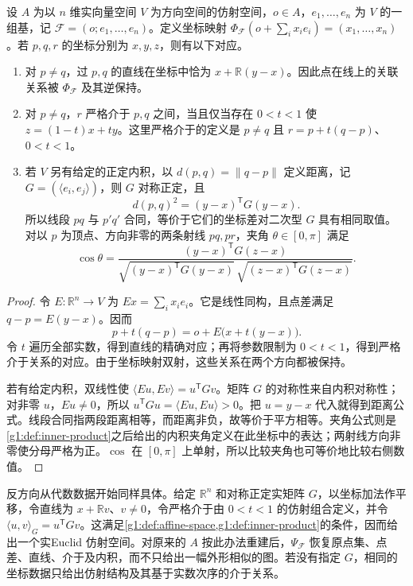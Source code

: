\begin{proposition}\label{g1:prop:affine-model-relations}
	设 \(A\) 为以 \(n\) 维实向量空间 \(V\) 为方向空间的仿射空间，\(o\in A\)，\(e_1,\ldots,e_n\) 为 \(V\) 的一组基，记 \(\mathcal F=(o;e_1,\ldots,e_n)\)。定义坐标映射 \(\Phi_{\mathcal F}(o+\sum_i x_i e_i)=(x_1,\ldots,x_n)\)。若 \(p,q,r\) 的坐标分别为 \(x,y,z\)，则有以下对应。
	\begin{enumerate}
		\item 对 \(p\ne q\)，过 \(p,q\) 的直线在坐标中恰为 \(x+\mathbb R(y-x)\)。因此点在线上的关联关系被 \(\Phi_{\mathcal F}\) 及其逆保持。
		\item 对 \(p\ne q\)，\(r\) 严格介于 \(p,q\) 之间，当且仅当存在 \(0<t<1\) 使 \(z=(1-t)x+ty\)。这里严格介于的定义是 \(p\ne q\) 且 \(r=p+t(q-p)\)、\(0<t<1\)。
		\item 若 \(V\) 另有给定的正定内积，以 \(d(p,q)=\lVert q-p\rVert\) 定义距离，记 \(G=(\langle e_i,e_j\rangle)\)，则 \(G\) 对称正定，且
		\begin{equation}\label{g1:eq:coordinate-model-distance}
			d(p,q)^2=(y-x)^{\mathsf T}G(y-x).
		\end{equation}
		所以线段 \(pq\) 与 \(p'q'\) 合同，等价于它们的坐标差对二次型 \(G\) 具有相同取值。对以 \(p\) 为顶点、方向非零的两条射线 \(pq,pr\)，夹角 \(\theta\in[0,\pi]\) 满足
		\[
			\cos\theta=
			\frac{(y-x)^{\mathsf T}G(z-x)}
			{\sqrt{(y-x)^{\mathsf T}G(y-x)}\,
			\sqrt{(z-x)^{\mathsf T}G(z-x)}}.
		\]
	\end{enumerate}
\end{proposition}
\begin{proof}
	令 \(E:\mathbb R^n\to V\) 为 \(Ex=\sum_i x_ie_i\)。它是线性同构，且点差满足 \(q-p=E(y-x)\)。因而
	\[
		p+t(q-p)=o+E\bigl(x+t(y-x)\bigr).
	\]
	令 \(t\) 遍历全部实数，得到直线的精确对应；再将参数限制为 \(0<t<1\)，得到严格介于关系的对应。由于坐标映射双射，这些关系在两个方向都被保持。

	若有给定内积，双线性使 \(\langle Eu,Ev\rangle=u^{\mathsf T}Gv\)。矩阵 \(G\) 的对称性来自内积对称性；对非零 \(u\)，\(Eu\ne0\)，所以 \(u^{\mathsf T}Gu=\langle Eu,Eu\rangle>0\)。把 \(u=y-x\) 代入就得到距离公式。线段合同指两段距离相等，而距离非负，故等价于平方相等。夹角公式则是\cref{g1:def:inner-product}之后给出的内积夹角定义在此坐标中的表达；两射线方向非零使分母严格为正。\(\cos\) 在 \([0,\pi]\) 上单射，所以比较夹角也可等价地比较右侧数值。
\end{proof}

反方向从代数数据开始同样具体。给定 \(\mathbb R^n\) 和对称正定实矩阵 \(G\)，以坐标加法作平移，令直线为 \(x+\mathbb Rv\)、\(v\ne0\)，令严格介于由 \(0<t<1\) 的仿射组合定义，并令 \(\langle u,v\rangle_G=u^{\mathsf T}Gv\)。这满足\cref{g1:def:affine-space,g1:def:inner-product}的条件，因而给出一个实Euclid 仿射空间。对原来的 \(A\) 按此办法重建后，\(\Psi_{\mathcal F}\) 恢复原点集、点差、直线、介于及内积，而不只给出一幅外形相似的图。若没有指定 \(G\)，相同的坐标数据只给出仿射结构及其基于实数次序的介于关系。

